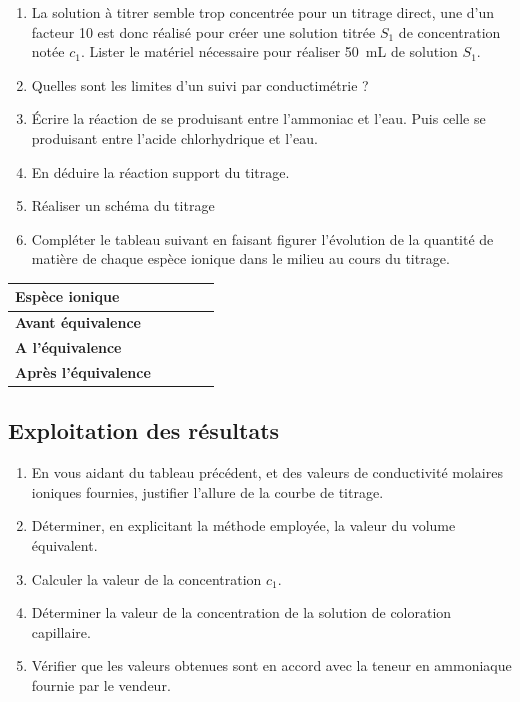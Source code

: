 \documentclass[a4paper,11pt,fleqn]{article}%
\begin{document}
\begin{enumerate}
	\item La solution à titrer semble trop concentrée pour un titrage direct, une  d'un facteur 10 est donc réalisé pour créer une solution titrée $S_1$ de concentration notée $c_1$. Lister le matériel nécessaire pour réaliser \SI{50}{mL} de solution $S_1$.
	\item Quelles sont les limites d'un suivi par conductimétrie ?
	\item Écrire la réaction de se produisant entre l'ammoniac  et l'eau. Puis celle se produisant entre l'acide chlorhydrique  et l'eau.
	\item En déduire la réaction support du titrage.
	\item Réaliser un schéma du titrage
	\item Compléter le tableau suivant en faisant figurer l'évolution de la quantité de matière de chaque espèce ionique dans le milieu au cours du titrage.
\end{enumerate}
\begin{table}[h!]
\centering
	\begin{tabular}{|>{\centering}m{}|>{\centering}m{}|>{\centering}m{}|>{\centering}m{}|>{\centering\arraybackslash}m{}|} \hline
	\textbf{Espèce ionique} & &&&\\ \hline
	\textbf{Avant équivalence} & &&&\\ \hline
	\textbf{A l'équivalence} & &&&\\ \hline
	\textbf{Après l'équivalence} & &&&\\ \hline
	\end{tabular}
\end{table}

	\subsection{Exploitation des résultats}

\begin{enumerate}[resume]
	\item En vous aidant du tableau précédent, et des valeurs de conductivité molaires ioniques fournies, justifier l'allure de la courbe de titrage.
	\item Déterminer, en explicitant la méthode employée, la valeur du volume équivalent.
	\item Calculer la valeur de la concentration $c_1$.
	\item Déterminer la valeur de la concentration de la solution de coloration capillaire.
	\item Vérifier que les valeurs obtenues sont en accord avec la teneur en ammoniaque fournie par le vendeur.
\end{enumerate}
\end{document}
